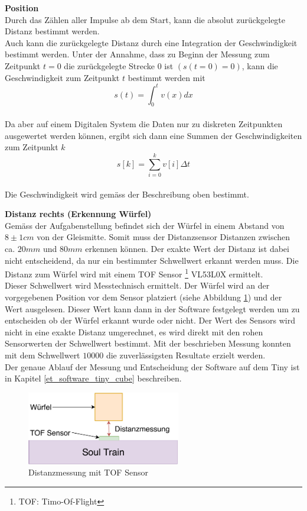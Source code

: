 \documentclass[../../main.tex]{subfiles}
\begin{document}
    \textbf{Position}\\
    Durch das Zählen aller Impulse ab dem Start, kann die absolut zurückgelegte Distanz bestimmt werden. \\Auch kann die zurückgelegte Distanz durch eine Integration der Geschwindigkeit bestimmt werden. Unter der Annahme, dass zu Beginn der Messung zum Zeitpunkt $t = 0$ die zurückgelegte Strecke $0$ ist $(s(t=0) = 0)$, kann die Geschwindigkeit zum Zeitpunkt $t$ bestimmt werden mit $$s(t) = \int_{0}^{t} v(x) dx$$\\
    Da aber auf einem Digitalen System die Daten nur zu diskreten Zeitpunkten ausgewertet werden können, ergibt sich dann eine Summen der Geschwindigkeiten zum Zeitpunkt $k$ $$s[k] = \sum_{i=0}^{k}v[i] \Delta t$$\\
    Die Geschwindigkeit wird gemäss der Beschreibung oben bestimmt.

    
    \textbf{Distanz rechts (Erkennung Würfel) }\\
    Gemäss der Aufgabenstellung befindet sich der Würfel in einem Abstand von $8\pm1cm$ von der Gleismitte. Somit muss der Distanzsensor Distanzen zwischen ca. $20mm$ und $80mm$ erkennen können. Der exakte Wert der Distanz ist dabei nicht entscheidend, da nur ein bestimmter Schwellwert erkannt werden muss. Die Distanz zum Würfel wird mit einem TOF Sensor \footnote{TOF: Timo-Of-Flight} VL53L0X ermittelt. \\
    Dieser Schwellwert wird Messtechnisch ermittelt. Der Würfel wird an der vorgegebenen Position vor dem Sensor platziert (siehe Abbildung \ref{fig:et_tof_messung}) und der Wert ausgelesen. Dieser Wert kann dann in der Software festgelegt werden um zu entscheiden ob der Würfel erkannt wurde oder nicht. Der Wert des Sensors wird nicht in eine exakte Distanz umgerechnet, es wird direkt mit den rohen Sensorwerten der Schwellwert bestimmt. Mit der beschrieben Messung konnten mit dem Schwellwert $10000$ die zuverlässigsten Resultate erzielt werden.\\
    Der genaue Ablauf der Messung und Entscheidung der Software auf dem Tiny ist in Kapitel \ref{et_software_tiny_cube} beschreiben.\\

    \begin{figure}[H]
        \centering
        \includegraphics[width=0.6\textwidth]{../../images/et/et_tof_messung.pdf}
        \caption {Distanzmessung mit TOF Sensor}
        \label{fig:et_tof_messung}
    \end{figure}
\end{document}
